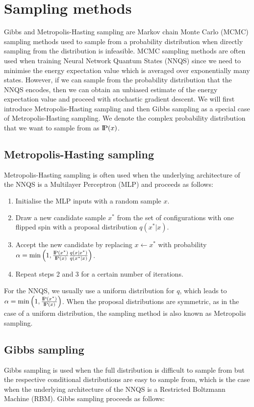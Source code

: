 \section{Sampling methods}\label{samplingmethods}
Gibbs and Metropolis-Hasting sampling are Markov chain Monte Carlo (MCMC) sampling methods used to sample from a probability distribution when directly sampling from the distribution is infeasible. MCMC sampling methods are often used when training Neural Network Quantum States (NNQS) since we need to minimise the energy expectation value which is averaged over exponentially many states. However, if we can sample from the probability distribution that the NNQS encodes, then we can obtain an unbiased estimate of the energy expectation value and proceed with stochastic gradient descent. We will first introduce Metropolis-Hasting sampling and then Gibbs sampling as a special case of Metropolis-Hasting sampling. We denote the complex probability distribution that we want to sample from as $\text{I\kern-0.15em P}(x)$.

\subsection*{Metropolis-Hasting sampling}
Metropolis-Hasting sampling \cite{metropolissampling} is often used when the underlying architecture of the NNQS is a Multilayer Perceptron (MLP) and proceeds as follows:
\begin{enumerate}
    \item Initialise the MLP inputs with a random sample $x$.
    \item Draw a new candidate sample $x^*$ from the set of configurations with one flipped spin with a proposal distribution $q(x^*|x)$.
    \item Accept the new candidate by replacing $x \leftarrow x^*$ with probability $\alpha = \min \left(1, \frac{\text{I\kern-0.15em P}(x^*)}{\text{I\kern-0.15em P}(x)} \frac{q(x|x^*)}{q(x^*|x)}\right)$.
    \item Repeat steps 2 and 3 for a certain number of iterations.
\end{enumerate}
For the NNQS, we usually use a uniform distribution for $q$, which leads to $\alpha = \min \left(1, \frac{\text{I\kern-0.15em P}(x^*)}{\text{I\kern-0.15em P}(x)} \right)$. When the proposal distributions are symmetric, as in the case of a uniform distribution, the sampling method is also known as Metropolis sampling.

\subsection*{Gibbs sampling}
Gibbs sampling \cite{gibbssampling} is used when the full distribution is difficult to sample from but the respective conditional distributions are easy to sample from, which is the case when the underlying architecture of the NNQS is a Restricted Boltzmann Machine (RBM). Gibbs sampling proceeds as follows:


